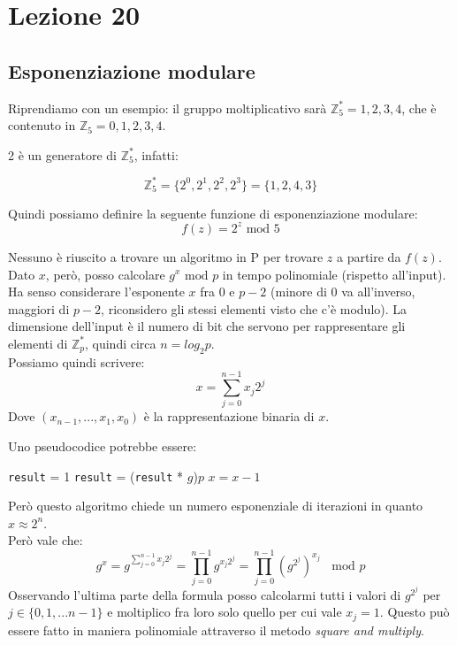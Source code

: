 \section*{Lezione 20}

\subsection*{Esponenziazione modulare}
Riprendiamo con un esempio: il gruppo moltiplicativo sarà $\mathbb{Z}_5^* = 1,2,3,4$, che è contenuto in $\mathbb{Z}_5 = {0,1,2,3,4}$.

2 è un generatore di $\mathbb{Z}_5^*$, infatti:

\[
\mathbb{Z}_5^* = \{2^0, 2^1, 2^2, 2^3\} = \{1,2,4,3\}
\]

Quindi possiamo definire la seguente funzione di esponenziazione modulare:
\begin{equation*}
f(z) = 2^z \text{ mod } 5
\end{equation*}

Nessuno è riuscito a trovare un algoritmo in P per trovare $z$ a partire da $f(z)$.
Dato $x$, però, posso calcolare $g^x \text { mod } p$ in tempo polinomiale (rispetto all'input). Ha senso considerare l'esponente $x$ fra 0 e $p-2$ (minore di 0 va all'inverso, maggiori di $p-2$, riconsidero gli stessi elementi visto che c'è modulo).
La dimensione dell'input è il numero di bit che servono per rappresentare gli elementi di $\mathbb{Z}_p^*$, quindi circa $n=log_2p$.\\
Possiamo quindi scrivere:
\begin{equation*}
	x = \sum_{j=0}^{n-1}x_j2^j
\end{equation*}
Dove $(x_{n-1}, ..., x_1, x_0)$ è la rappresentazione binaria di $x$.

Uno pseudocodice potrebbe essere:

\medskip
	\begin{algorithmic}
	\State \texttt{result} = 1
	\State \texttt{result} = (\texttt{result} * $g$)$p$
	\State $x = x - 1$
	\EndWhile
\end{algorithmic}

\medskip
Però questo algoritmo chiede un numero esponenziale di iterazioni in quanto $x \approx 2^n$.\\


Però vale che:
\begin{equation*}
	g^x = g^{\sum_{j=0}^{n-1}x_j2^j} = \prod_{j=0}^{n-1} g^{x_j2^j}= \prod_{j=0}^{n-1}(g^{2^j})^{x_j} \; \; \text{ mod } p
\end{equation*}
Osservando l'ultima parte della formula posso calcolarmi tutti i valori di $g^{2^j}$ per $j \in \{0,1,...n-1\}$ e moltiplico fra loro solo quello per cui vale $x_j = 1$. Questo può essere fatto in maniera polinomiale attraverso il metodo \textit{square and multiply}.

